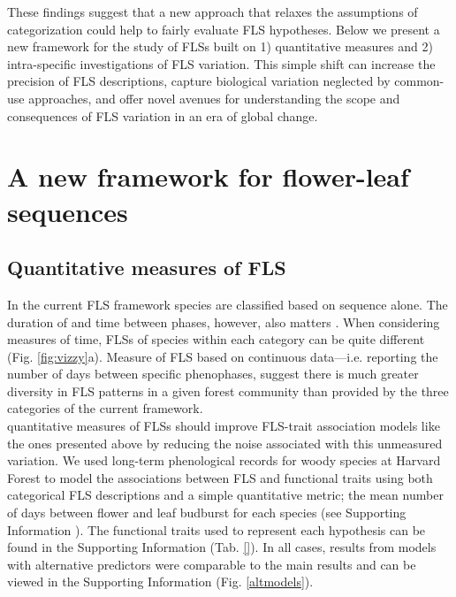 \documentclass[11pt]{article}
\begin{document}
\noindent These findings suggest that a new approach that relaxes the assumptions of categorization could help to fairly evaluate FLS hypotheses. Below we present a new framework for the study of FLSs built on 1) quantitative measures and 2) intra-specific investigations of FLS variation. This simple shift can increase the precision of FLS descriptions, capture biological variation neglected by common-use approaches, and offer novel avenues for understanding the scope and consequences of FLS variation in an era of global change.

 
\section*{A new framework for flower-leaf sequences} 

\subsection*{Quantitative measures of FLS}

\noindent In the current FLS framework species are classified based on sequence alone. The duration of and time between phases, however, also matters \citep{Inouye2019}. When considering measures of time, FLSs of species within each category can be quite different (Fig. \ref{fig:vizzy}a). Measure of FLS based on continuous data---i.e. reporting the number of days between specific phenophases, suggest there is much greater diversity in FLS patterns in a given forest community than provided by the three categories of the current framework.\\ 

\noindent quantitative measures of FLSs should improve FLS-trait association models like the ones presented above by reducing the noise associated with this unmeasured variation. We used long-term phenological records for woody species at Harvard Forest \citep{OKeefe2015} to model the associations between FLS and functional traits using both categorical FLS descriptions and a simple quantitative metric; the mean number of days between flower and leaf budburst for each species (see Supporting Information ). The functional traits used to represent each hypothesis can be found in the Supporting Information (Tab. \ref{}).  In all cases, results from models with alternative predictors were comparable to the main results and can be viewed in the Supporting Information (Fig. \ref{altmodels}).\\
\end{document}
